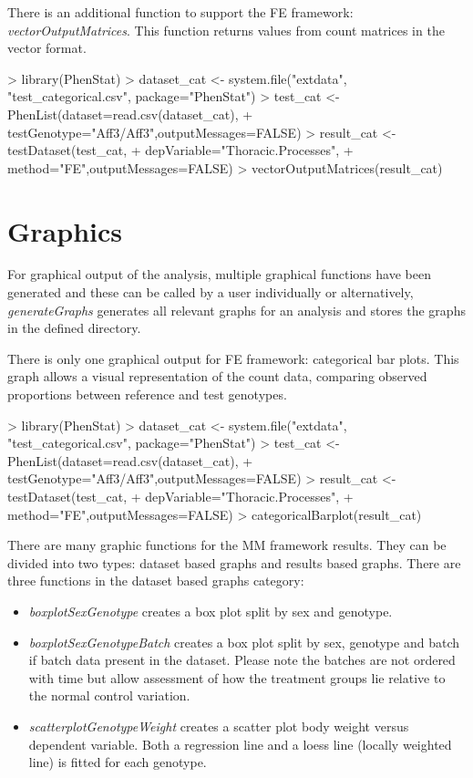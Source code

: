\documentclass[a4paper]{article}
\begin{document}
There is an additional function to support the FE framework: \textit{vectorOutputMatrices}. This function returns values from count matrices in the vector format.

\begin{Schunk}
\begin{Sinput}
> library(PhenStat)
> dataset_cat <- system.file("extdata", "test_categorical.csv", package="PhenStat")
> test_cat <- PhenList(dataset=read.csv(dataset_cat),
+         testGenotype="Aff3/Aff3",outputMessages=FALSE)
> result_cat <- testDataset(test_cat,
+         depVariable="Thoracic.Processes",
+         method="FE",outputMessages=FALSE) 
> vectorOutputMatrices(result_cat)
\end{Sinput}
\end{Schunk}

\section{Graphics}
For graphical output of the analysis, multiple graphical functions have been generated and these can be called by a user individually or alternatively, 
\textit{generateGraphs} generates all relevant graphs for an analysis and stores the graphs in the defined directory. 

There is only one graphical output for FE framework: categorical bar plots. This graph allows a visual representation of the count data, comparing observed proportions between reference and test genotypes.  

\begin{Schunk}
\begin{Sinput}
> library(PhenStat)
> dataset_cat <- system.file("extdata", "test_categorical.csv", package="PhenStat")
> test_cat <- PhenList(dataset=read.csv(dataset_cat),
+         testGenotype="Aff3/Aff3",outputMessages=FALSE)
> result_cat <- testDataset(test_cat,
+         depVariable="Thoracic.Processes",
+         method="FE",outputMessages=FALSE) 
> categoricalBarplot(result_cat)
\end{Sinput}
\end{Schunk}

There are many graphic functions for the MM framework results. They can be divided into two types: dataset based graphs and results based graphs.
There are three functions in the dataset based graphs category:
\begin{itemize}
\item \textit{boxplotSexGenotype} creates a box plot split by sex and genotype.
\item \textit{boxplotSexGenotypeBatch} creates a box plot split by sex, genotype and batch if batch data present in the dataset. Please note the batches are not ordered with time but allow assessment of how the treatment groups lie relative to the normal control variation.
\item \textit{scatterplotGenotypeWeight} creates a scatter plot body weight versus dependent variable. Both a regression line and a loess line (locally weighted line) is fitted for each genotype.
\end{itemize}
\end{document}
